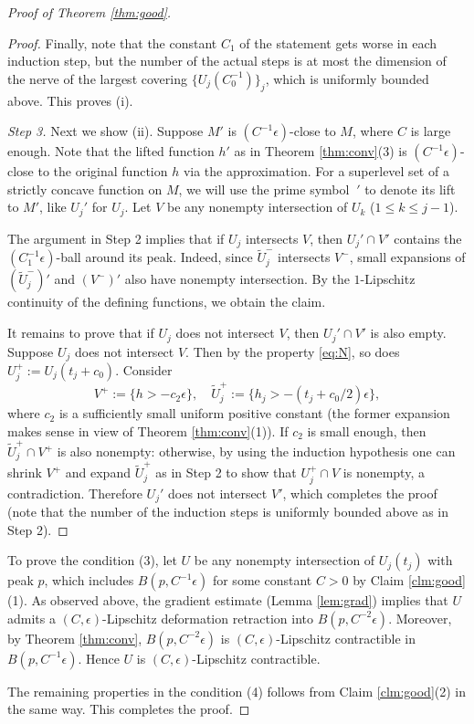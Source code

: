 \documentclass[a4paper,12pt]{amsart}
\theoremstyle{plain}
\theoremstyle{definition}
\numberwithin{thm}{section}
\numberwithin{equation}{section}
\newcommand{\step}[1]{\medskip\noindent\textit{#1.}}
\begin{document}
\begin{proof}[Proof of Theorem \ref{thm:good}]
\begin{proof}
Finally, note that the constant $C_1$ of the statement gets worse in each induction step, but the number of the actual steps is at most the dimension of the nerve of the largest covering $\{U_j(C_0^{-1})\}_j$, which is uniformly bounded above.
This proves (i).

\step{Step 3}
Next we show (ii).
Suppose $M'$ is $(C^{-1}\epsilon)$-close to $M$, where $C$ is large enough.
Note that the lifted function $h'$ as in Theorem \ref{thm:conv}(3) is $(C^{-1}\epsilon)$-close to the original function $h$ via the approximation.
For a superlevel set of a strictly concave function on $M$, we will use the prime symbol $\ '$ to denote its lift to $M'$, like $U_j'$ for $U_j$.
Let $V$ be any nonempty intersection of $U_k$ ($1\le k\le j-1$).

The argument in Step 2 implies that if $U_j$ intersects $V$, then $U_j'\cap V'$ contains the $(C_1^{-1}\epsilon)$-ball around its peak.
Indeed, since $\tilde U_j^-$ intersects $V^-$, small expansions of $(\tilde U_j^-)'$ and $(V^-)'$ also have nonempty intersection.
By the $1$-Lipschitz continuity of the defining functions, we obtain the claim.

It remains to prove that if $U_j$ does not intersect $V$, then $U_j'\cap V'$ is also empty.
Suppose $U_j$ does not intersect $V$.
Then by the property \eqref{eq:N}, so does $U_j^+:=U_j(t_j+c_0)$.
Consider
\[V^+:=\{h>-c_2\epsilon\},\quad\tilde U_j^+:=\{h_j>-(t_j+c_0/2)\epsilon\},\]
where $c_2$ is a sufficiently small uniform positive constant (the former expansion makes sense in view of Theorem \ref{thm:conv}(1)).
If $c_2$ is small enough, then $\tilde U_j^+\cap V^+$ is also nonempty: otherwise, by using the induction hypothesis one can shrink $V^+$ and expand $\tilde U_j^+$ as in Step 2 to show that $U_j^+\cap V$ is nonempty, a contradiction.
Therefore $U_j'$ does not intersect $V'$, which completes the proof (note that the number of the induction steps is uniformly bounded above as in Step 2).
\end{proof}

To prove the condition (3), let $U$ be any nonempty intersection of $U_j(t_j)$ with peak $p$, which includes $B(p,C^{-1}\epsilon)$ for some constant $C>0$ by Claim \ref{clm:good}(1).
As observed above, the gradient estimate (Lemma \ref{lem:grad}) implies that $U$ admits a $(C,\epsilon)$-Lipschitz deformation retraction into $B(p,C^{-2}\epsilon)$.
Moreover, by Theorem \ref{thm:conv}, $B(p,C^{-2}\epsilon)$ is $(C,\epsilon)$-Lipschitz contractible in $B(p,C^{-1}\epsilon)$.
Hence $U$ is $(C,\epsilon)$-Lipschitz contractible.

The remaining properties in the condition (4) follows from Claim \ref{clm:good}(2) in the same way.
This completes the proof.
\end{proof}
\end{document}
